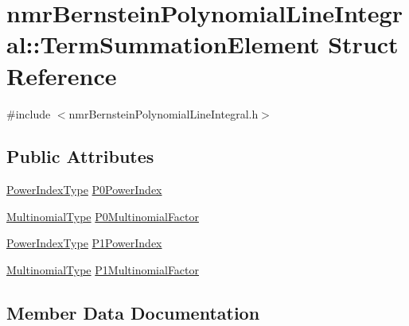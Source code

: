 \hypertarget{structnmr_bernstein_polynomial_line_integral_1_1_term_summation_element}{}\section{nmr\+Bernstein\+Polynomial\+Line\+Integral\+:\+:Term\+Summation\+Element Struct Reference}
\label{structnmr_bernstein_polynomial_line_integral_1_1_term_summation_element}


{\ttfamily \#include $<$nmr\+Bernstein\+Polynomial\+Line\+Integral.\+h$>$}

\subsection*{Public Attributes}
\begin{DoxyCompactItemize}
\item 
\hyperlink{classnmr_bernstein_polynomial_line_integral_a16dae5a5a7adabc4c3356c857aeb3841}{Power\+Index\+Type} \hyperlink{structnmr_bernstein_polynomial_line_integral_1_1_term_summation_element_a3f22a71b47cf410589d11cffe810ac99}{P0\+Power\+Index}
\item 
\hyperlink{classnmr_bernstein_polynomial_line_integral_a284a932e77c5c38a5d6959c4992d5300}{Multinomial\+Type} \hyperlink{structnmr_bernstein_polynomial_line_integral_1_1_term_summation_element_a7ebc3563775007a6e90af478c2220444}{P0\+Multinomial\+Factor}
\item 
\hyperlink{classnmr_bernstein_polynomial_line_integral_a16dae5a5a7adabc4c3356c857aeb3841}{Power\+Index\+Type} \hyperlink{structnmr_bernstein_polynomial_line_integral_1_1_term_summation_element_a3eca58974e87a3625ec449a076fed408}{P1\+Power\+Index}
\item 
\hyperlink{classnmr_bernstein_polynomial_line_integral_a284a932e77c5c38a5d6959c4992d5300}{Multinomial\+Type} \hyperlink{structnmr_bernstein_polynomial_line_integral_1_1_term_summation_element_a870017786f9f1cf36bfea177572de31a}{P1\+Multinomial\+Factor}
\end{DoxyCompactItemize}


\subsection{Member Data Documentation}
\hypertarget{structnmr_bernstein_polynomial_line_integral_1_1_term_summation_element_a7ebc3563775007a6e90af478c2220444}{}

